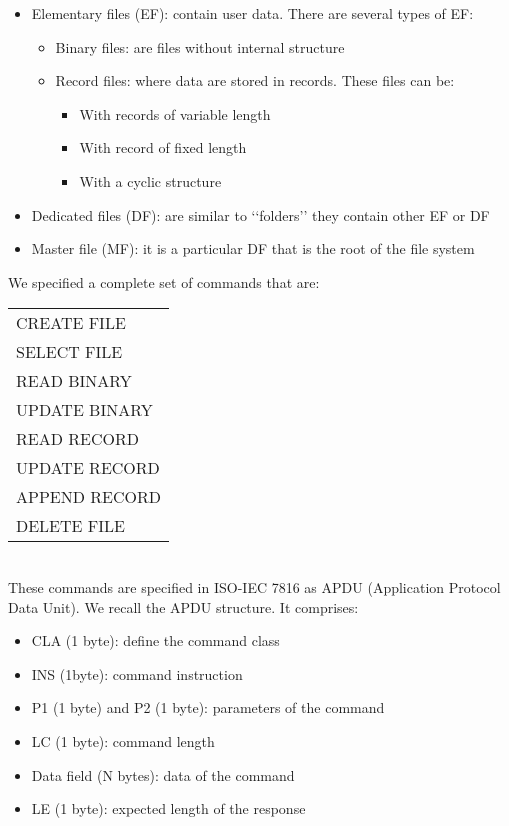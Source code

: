 \begin{itemize}
\item Elementary files (EF): contain user data. There are several types of EF:
\begin{itemize}
\item Binary files: are files without internal structure
\item Record files: where data are stored in records. These files can be:
\begin{itemize}
\item With records of variable length
\item With record of fixed length
\item With a cyclic structure
\end{itemize}
\end{itemize}
\item Dedicated files (DF): are similar to \lq\lq folders\rq\rq\; they contain
other EF or DF

\item Master file (MF): it is a particular DF that is the root of the
file system

\end{itemize}
We specified a complete set of commands that are:\\
\begin{tabular}{l}
CREATE FILE \\
SELECT FILE \\
READ BINARY \\
UPDATE BINARY \\
READ RECORD \\
UPDATE RECORD \\
APPEND RECORD \\
DELETE FILE
\end{tabular}\\
These commands are specified in ISO-IEC 7816 as APDU (Application
Protocol Data Unit). We recall the APDU structure. It comprises:
\begin{itemize}
\item CLA (1 byte): define the command class 
\item  INS (1byte): command instruction
\item  P1 (1 byte) and P2 (1 byte): parameters of the command
\item  LC (1 byte): command length
\item  Data field (N bytes): data of the command
\item LE (1 byte): expected length of the response
\end{itemize}
